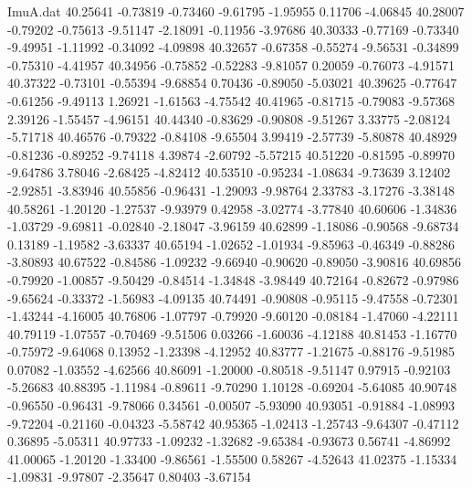 \begin{filecontents}{ImuA.dat}
  40.25641   -0.73819   -0.73460   -9.61795   -1.95955    0.11706   -4.06845
  40.28007   -0.79202   -0.75613   -9.51147   -2.18091   -0.11956   -3.97686
  40.30333   -0.77169   -0.73340   -9.49951   -1.11992   -0.34092   -4.09898
  40.32657   -0.67358   -0.55274   -9.56531   -0.34899   -0.75310   -4.41957
  40.34956   -0.75852   -0.52283   -9.81057    0.20059   -0.76073   -4.91571
  40.37322   -0.73101   -0.55394   -9.68854    0.70436   -0.89050   -5.03021
  40.39625   -0.77647   -0.61256   -9.49113    1.26921   -1.61563   -4.75542
  40.41965   -0.81715   -0.79083   -9.57368    2.39126   -1.55457   -4.96151
  40.44340   -0.83629   -0.90808   -9.51267    3.33775   -2.08124   -5.71718
  40.46576   -0.79322   -0.84108   -9.65504    3.99419   -2.57739   -5.80878
  40.48929   -0.81236   -0.89252   -9.74118    4.39874   -2.60792   -5.57215
  40.51220   -0.81595   -0.89970   -9.64786    3.78046   -2.68425   -4.82412
  40.53510   -0.95234   -1.08634   -9.73639    3.12402   -2.92851   -3.83946
  40.55856   -0.96431   -1.29093   -9.98764    2.33783   -3.17276   -3.38148
  40.58261   -1.20120   -1.27537   -9.93979    0.42958   -3.02774   -3.77840
  40.60606   -1.34836   -1.03729   -9.69811   -0.02840   -2.18047   -3.96159
  40.62899   -1.18086   -0.90568   -9.68734    0.13189   -1.19582   -3.63337
  40.65194   -1.02652   -1.01934   -9.85963   -0.46349   -0.88286   -3.80893
  40.67522   -0.84586   -1.09232   -9.66940   -0.90620   -0.89050   -3.90816
  40.69856   -0.79920   -1.00857   -9.50429   -0.84514   -1.34848   -3.98449
  40.72164   -0.82672   -0.97986   -9.65624   -0.33372   -1.56983   -4.09135
  40.74491   -0.90808   -0.95115   -9.47558   -0.72301   -1.43244   -4.16005
  40.76806   -1.07797   -0.79920   -9.60120   -0.08184   -1.47060   -4.22111
  40.79119   -1.07557   -0.70469   -9.51506    0.03266   -1.60036   -4.12188
  40.81453   -1.16770   -0.75972   -9.64068    0.13952   -1.23398   -4.12952
  40.83777   -1.21675   -0.88176   -9.51985    0.07082   -1.03552   -4.62566
  40.86091   -1.20000   -0.80518   -9.51147    0.97915   -0.92103   -5.26683
  40.88395   -1.11984   -0.89611   -9.70290    1.10128   -0.69204   -5.64085
  40.90748   -0.96550   -0.96431   -9.78066    0.34561   -0.00507   -5.93090
  40.93051   -0.91884   -1.08993   -9.72204   -0.21160   -0.04323   -5.58742
  40.95365   -1.02413   -1.25743   -9.64307   -0.47112    0.36895   -5.05311
  40.97733   -1.09232   -1.32682   -9.65384   -0.93673    0.56741   -4.86992
  41.00065   -1.20120   -1.33400   -9.86561   -1.55500    0.58267   -4.52643
  41.02375   -1.15334   -1.09831   -9.97807   -2.35647    0.80403   -3.67154

\end{filecontents}
